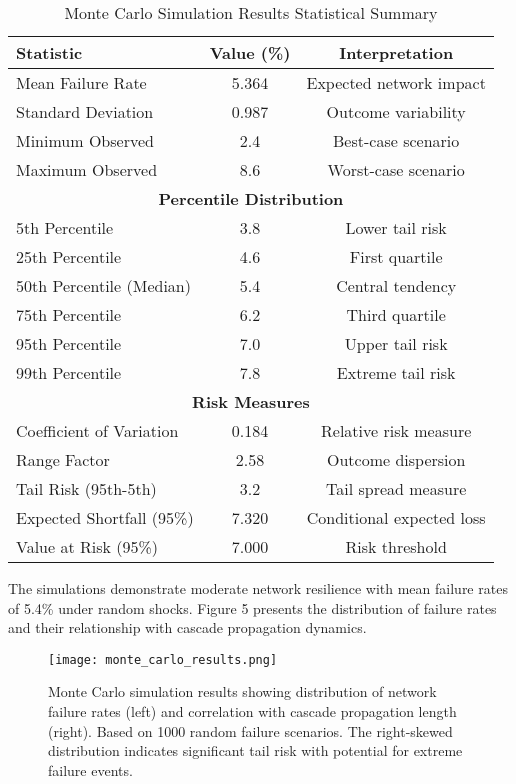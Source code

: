 \documentclass[a4 paper, 11pt,twoside]{article}
\newcommand{\0}{\Bf{0}}
\theoremstyle{definition}
\begin{document}
\begin{table}[H]
\centering
\caption{Monte Carlo Simulation Results Statistical Summary}
\begin{tabular}{@{}lcc@{}}
\toprule
\textbf{Statistic} & \textbf{Value (\%)} & \textbf{Interpretation} \\
\midrule
Mean Failure Rate & 5.364 & Expected network impact \\
Standard Deviation & 0.987 & Outcome variability \\
Minimum Observed & 2.4 & Best-case scenario \\
Maximum Observed & 8.6 & Worst-case scenario \\
\midrule
\multicolumn{3}{c}{\textbf{Percentile Distribution}} \\
\midrule
5th Percentile & 3.8 & Lower tail risk \\
25th Percentile & 4.6 & First quartile \\
50th Percentile (Median) & 5.4 & Central tendency \\
75th Percentile & 6.2 & Third quartile \\
95th Percentile & 7.0 & Upper tail risk \\
99th Percentile & 7.8 & Extreme tail risk \\
\midrule
\multicolumn{3}{c}{\textbf{Risk Measures}} \\
\midrule
Coefficient of Variation & 0.184 & Relative risk measure \\
Range Factor & 2.58 & Outcome dispersion \\
Tail Risk (95th-5th) & 3.2 & Tail spread measure \\
Expected Shortfall (95\%) & 7.320 & Conditional expected loss \\
Value at Risk (95\%) & 7.000 & Risk threshold \\
\bottomrule
\end{tabular}
\end{table}

The simulations demonstrate moderate network resilience with mean failure rates of 5.4\% under random shocks. Figure 5 presents the distribution of failure rates and their relationship with cascade propagation dynamics.

\begin{figure}[H]
\centering
\texttt{[image: monte\_carlo\_results.png]}
\caption{Monte Carlo simulation results showing distribution of network failure rates (left) and correlation with cascade propagation length (right). Based on 1000 random failure scenarios. The right-skewed distribution indicates significant tail risk with potential for extreme failure events.}
\end{figure}
\end{document}
